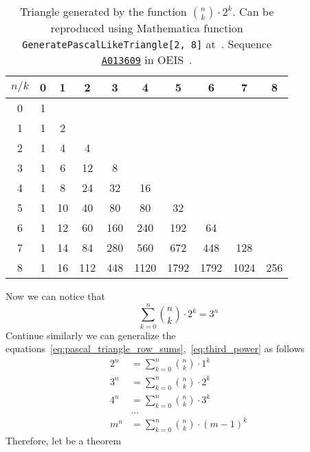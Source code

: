 \begin{table}[H]
    \begin{tabular}{c|ccccccccc}
        $n/k$ & 0 & 1  & 2   & 3   & 4    & 5    & 6    & 7    & 8 \\ [3px]
        \hline
        0     & 1 &    &     &     &      &      &      &      &     \\
        1     & 1 & 2  &     &     &      &      &      &      &     \\
        2     & 1 & 4  & 4   &     &      &      &      &      &     \\
        3     & 1 & 6  & 12  & 8   &      &      &      &      &     \\
        4     & 1 & 8  & 24  & 32  & 16   &      &      &      &     \\
        5     & 1 & 10 & 40  & 80  & 80   & 32   &      &      &     \\
        6     & 1 & 12 & 60  & 160 & 240  & 192  & 64   &      &     \\
        7     & 1 & 14 & 84  & 280 & 560  & 672  & 448  & 128  &     \\
        8     & 1 & 16 & 112 & 448 & 1120 & 1792 & 1792 & 1024 & 256 \\
    \end{tabular}
    \caption{Triangle generated by the function $\binom{n}{k}\cdot 2^k$.
    Can be reproduced using Mathematica function \texttt{GeneratePascalLikeTriangle[2, 8]} at~\cite{PK22Source}.
    Sequence \href{https://oeis.org/A013609}{\texttt{A013609}} in OEIS~\cite{Sloane_theencyclopedia}.}
    \label{tab:third_power}
\end{table}
Now we can notice that
\begin{equation}
    \sum_{k=0}^{n} \binom{n}{k} \cdot 2^k = 3^n\label{eq:third_power}
\end{equation}
Continue similarly we can generalize the equations~\eqref{eq:pascal_triangle_row_sums},~\eqref{eq:third_power} as follows
\begin{align*}
    2^n &= \sum_{k=0}^{n}\binom{n}{k} \cdot 1^k \\
    3^n &= \sum_{k=0}^{n}\binom{n}{k} \cdot 2^k \\
    4^n &= \sum_{k=0}^{n}\binom{n}{k} \cdot 3^k \\
    &\dots \\
    m^n &= \sum_{k=0}^{n}\binom{n}{k} \cdot (m-1)^k
\end{align*}
Therefore, let be a theorem
